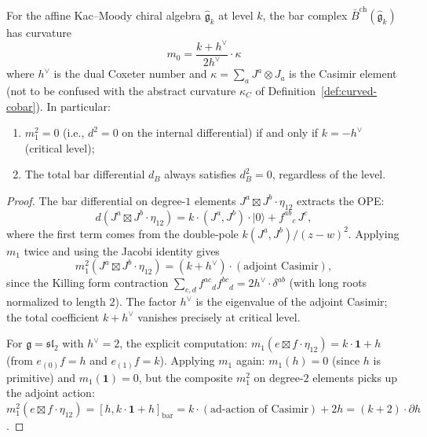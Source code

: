 \begin{proposition}
\label{prop:km-bar-curvature}
For the affine Kac--Moody chiral algebra $\widehat{\mathfrak{g}}_k$ at level $k$, the bar complex $\bar{B}^{\mathrm{ch}}(\widehat{\mathfrak{g}}_k)$ has curvature
\begin{equation}\label{eq:km-curvature-part1}
m_0 = \frac{k + h^\vee}{2h^\vee} \cdot \kappa
\end{equation}
where $h^\vee$ is the dual Coxeter number and $\kappa = \sum_a J^a \otimes J_a$ is the Casimir element (not to be confused with the abstract curvature $\kappa_C$ of Definition~\ref{def:curved-cobar}).  In particular:
\begin{enumerate}[label=\textup{(\roman*)}]
\item $m_1^2 = 0$ \textup{(}i.e., $d^2 = 0$ on the internal differential\textup{)} if and only if $k = -h^\vee$ \textup{(}critical level\textup{)};
\item The total bar differential $d_B$ always satisfies $d_B^2 = 0$, regardless of the level.
\end{enumerate}
\end{proposition}

\begin{proof}
The bar differential on degree-$1$ elements $J^a \boxtimes J^b \cdot \eta_{12}$ extracts the OPE:
\[
d(J^a \boxtimes J^b \cdot \eta_{12}) = k \cdot (J^a, J^b) \cdot |0\rangle + f^{ab}{}_{c}\, J^c,
\]
where the first term comes from the double-pole $k(J^a,J^b)/(z-w)^2$.
Applying $m_1$ twice and using the Jacobi identity gives
\[
m_1^2(J^a \boxtimes J^b \cdot \eta_{12}) = (k + h^\vee) \cdot (\text{adjoint Casimir}),
\]
since the Killing form contraction $\sum_{c,d} f^{ac}{}_d f^{bc}{}_d = 2h^\vee \cdot \delta^{ab}$ (with long roots normalized to length $2$).  The factor $h^\vee$ is the eigenvalue of the adjoint Casimir; the total coefficient $k + h^\vee$ vanishes precisely at critical level.

For $\mathfrak{g} = \mathfrak{sl}_2$ with $h^\vee = 2$, the explicit computation:
$m_1(e \boxtimes f \cdot \eta_{12}) = k \cdot \mathbf{1} + h$ (from
$e_{(0)}f = h$ and $e_{(1)}f = k$).  Applying $m_1$ again:
$m_1(h) = 0$ (since $h$ is primitive) and
$m_1(\mathbf{1}) = 0$, but the composite $m_1^2$ on degree-$2$
elements picks up the adjoint action:
$m_1^2(e \boxtimes f \cdot \eta_{12}) = [h, k \cdot \mathbf{1} + h]_{\mathrm{bar}}
= k \cdot (\text{ad-action of Casimir}) + 2h = (k+2) \cdot \partial h$.
\end{proof}

